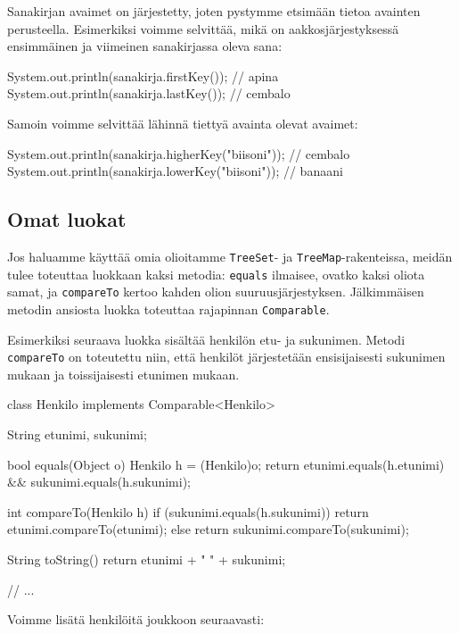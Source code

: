 Sanakirjan avaimet on järjestetty,
joten pystymme etsimään tietoa avainten perusteella.
Esimerkiksi voimme selvittää, mikä on aakkosjärjestyksessä
ensimmäinen ja viimeinen sanakirjassa oleva sana:

\begin{code}
System.out.println(sanakirja.firstKey()); // apina
System.out.println(sanakirja.lastKey()); // cembalo
\end{code}

Samoin voimme selvittää lähinnä tiettyä avainta olevat avaimet:

\begin{code}
System.out.println(sanakirja.higherKey("biisoni")); // cembalo
System.out.println(sanakirja.lowerKey("biisoni")); // banaani
\end{code}

\subsection{Omat luokat}

Jos haluamme käyttää omia olioitamme \texttt{TreeSet}- ja
\texttt{TreeMap}-rakenteissa, meidän tulee toteuttaa
luokkaan kaksi metodia:
\texttt{equals} ilmaisee, ovatko kaksi oliota samat,
ja \texttt{compareTo} kertoo kahden olion suuruusjärjestyksen.
Jälkimmäisen metodin ansiosta luokka toteuttaa rajapinnan
\texttt{Comparable}.

Esimerkiksi seuraava luokka sisältää henkilön etu- ja sukunimen.
Metodi \texttt{compareTo} on toteutettu niin,
että henkilöt järjestetään ensisijaisesti sukunimen mukaan ja
toissijaisesti etunimen mukaan.

\begin{code}
class Henkilo implements Comparable<Henkilo> {
    String etunimi, sukunimi;

    bool equals(Object o) {
        Henkilo h = (Henkilo)o;
        return etunimi.equals(h.etunimi) &&
               sukunimi.equals(h.sukunimi);
    }

    int compareTo(Henkilo h) {
        if (sukunimi.equals(h.sukunimi)) {
            return etunimi.compareTo(etunimi);
        } else {
            return sukunimi.compareTo(sukunimi);
        }
    }

    String toString() {
        return etunimi + " " + sukunimi;
    }

    // ...
}
\end{code}

Voimme lisätä henkilöitä joukkoon seuraavasti:


